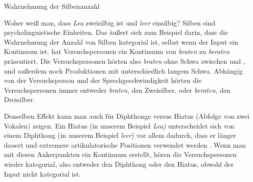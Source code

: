\begin{Exkurs}{Wahrnehmung der Silbenanzahl}\label{ex:Silbenanzahl}

\largerpage
Woher weiß man, dass \textit{Lea} zweisilbig ist und \textit{leer} einsilbig? Silben sind psycholinguistische Einheiten. Das äußert sich zum Beispiel darin, dass die Wahrnehmung der Anzahl von Silben kategorial ist, selbst wenn der Input ein Kontinuum ist. \citet{Jannedy1994} hat Versuchspersonen ein Kontinuum von \textit{braten} zu \textit{beraten} präsentiert. Die Versuchspersonen hörten also \textit{braten} ohne Schwa zwischen \textipa{[b]} und \textipa{[K]}, und außerdem noch Produktionen mit unterschiedlich langem Schwa. Abhängig von der Versuchsperson und der Sprechgeschwindigkeit hörten die Versuchspersonen immer entweder \textit{braten}, den Zweisilber, oder \textit{beraten}, den Dreisilber.

Denselben Effekt kann man auch für Diphthonge versus Hiatus (Abfolge von zwei Vokalen) zeigen. Ein Hiatus (in unserem Beispiel \textit{Lea)} unterscheidet sich von einem Diphthong (in unserem Beispiel \textit{leer}) vor allem dadurch, dass er länger dauert und extremere artikulatorische Positionen verwendet werden \citep{Aguilar1999}. Wenn man mit diesen Ankerpunkten ein Kontinuum erstellt, hören die Versuchspersonen wieder kategorial, also entweder den Diphthong oder den Hiatus, obwohl der Input nicht kategorial ist. 
\end{Exkurs}

